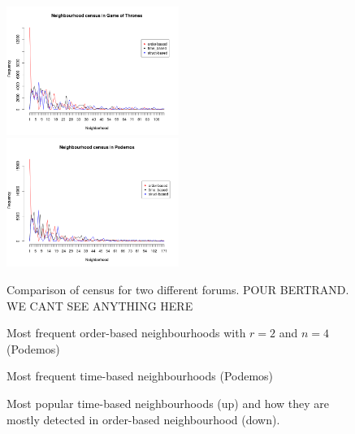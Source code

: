 \documentclass[conference]{IEEEtran}
\begin{document}
\begin{figure}
\centering
\includegraphics[width=0.5\textwidth]{neighbourhood_census_compare_gameofthrones}%
\includegraphics[width=0.5\textwidth]{neighbourhood_census_compare_podemos}
\caption{Comparison of census for two different forums. POUR BERTRAND. WE CANT SEE ANYTHING HERE}
\label{fig:census_compare}
\end{figure}

\begin{figure}
	\centering
	\caption{Most frequent order-based neighbourhoods with $r=2$ and $n=4$ (Podemos)}
	\label{fig:census_orderbased}
\end{figure}
\begin{figure}
	\centering
	\caption{Most frequent time-based neighbourhoods (Podemos)}
	\label{fig:neighbourhoods_time}
\end{figure}

\begin{figure}
\centering
\caption{Most popular time-based neighbourhoods (up) and how they are mostly detected in order-based neighbourhood (down).}
\label{fig:census_size_vs_freq}
\end{figure}
\end{document}
